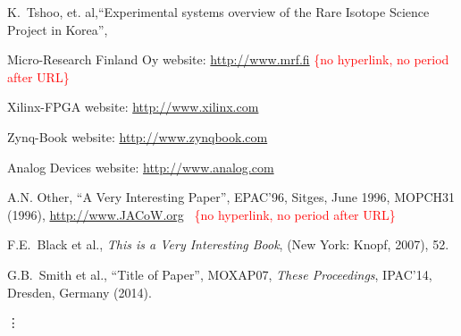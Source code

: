 \documentclass[a4paper,
              ]{jacow}
\begin{document}
\iffalse  %
	\newpage
	\printbibliography

\else

\begin{thebibliography}{9}   %

 K.~Tshoo,{ et. al},``Experimental systems overview of the Rare Isotope Science Project in Korea'',

	Micro-Research Finland Oy website:
	\url{http://www.mrf.fi}%
	\hfill\textcolor{red}{\{no hyperlink, no period after URL\}}


Xilinx-FPGA website:
\url{http://www.xilinx.com}

Zynq-Book website:
\url{http://www.zynqbook.com}


Analog Devices website:
\url{http://www.analog.com}

	A.N. Other,
	``A Very Interesting Paper'',
	EPAC'96, Sitges, June 1996, MOPCH31 (1996),
	\url{http://www.JACoW.org}\newline \mbox{ } \hfill\textcolor{red}{\{no hyperlink, no period after URL\}}

	F.E.~Black et al.,
	\textit{This is a Very Interesting Book},
	(New York: Knopf, 2007), 52.

    G.B.~Smith et al., ``Title of Paper'',
    MOXAP07, \textit{These Proceedings}, IPAC'14, Dresden, Germany (2014).

	\hspace*{-1.1em}\mbox{\vdots}


\end{thebibliography}

\fi
\end{document}
